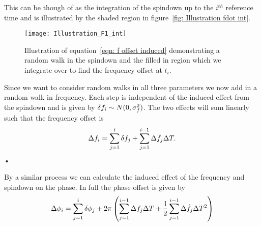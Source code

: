 This can be though of as the integration of the spindown up to the $i^{th}$
reference time and is illustrated by the shaded region in figure~\ref{fig:
Illustration fdot int}. 

\begin{figure}[ht]
\centering
\texttt{[image: Illustration\_F1\_int]}
\caption{Illustration of equation~\eqref{eqn: f offset induced} demonstrating
a random walk in the spindown and the filled in region which we
integrate over to find the frequency offset at $t_{i}$.}
\label{fig: Illustration fdot int}
\end{figure}

Since we want to consider random walks in all three parameters we now add in a
random walk in frequency. Each step is independent of the induced effect from
the spindown and is given by \mbox{$\delta f_{i} \sim N(0, \sigma_{f}^{2})$}. The two
effects will sum linearly such that the frequency offset is
\begin{equation}
\Delta f_{i} = \sum_{j=1}^{i}\delta f_{j} + \sum_{j=1}^{i-1}\Delta\dot{f}_{j} \Delta T.
\label{eqn: f offset} 
\end{equation}•

By a similar process we can calculate the induced effect of the frequency and
spindown on the phase. In full the phase offset is given by
\begin{equation}
\Delta\phi_{i}  =  \sum_{j=1}^{i}\delta \phi_{j} 
+ 2\pi\left(\sum_{j=1}^{i-1}\Delta f_{j}\Delta T 
+ \frac{1}{2}\sum_{j=1}^{i-1}\Delta \dot{f}_{j}\Delta T^{2}\right) \label{eqn: phi offset} 
\end{equation}



